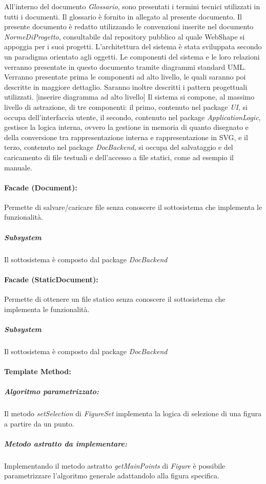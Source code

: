 All'interno del documento \textit{Glossario}, sono presentati i termini tecnici utilizzati in tutti i documenti. Il glossario \`e fornito in allegato al presente documento.
Il presente documento \`e redatto utilizzando le convenzioni inserite nel documento \textit{NormeDiProgetto}, consultabile dal repository pubblico al quale WebShape si appoggia per i suoi progetti.
L'architettura del sistema \`e stata sviluppata secondo un paradigma orientato agli oggetti. Le componenti del sistema e le loro relazioni verranno presentate in questo documento tramite diagrammi standard UML. Verranno presentate prima le componenti ad alto livello, le quali saranno poi descritte in maggiore dettaglio. Saranno inoltre descritti i pattern progettuali utilizzati.
[inserire diagramma ad alto livello]
Il sistema si compone, al massimo livello di astrazione, di tre componenti: il primo, contenuto nel package \textit{UI}, si occupa dell'interfaccia utente, il secondo, contenuto nel package \textit{ApplicationLogic}, gestisce la logica interna, ovvero la gestione in memoria di quanto disegnato e della conversione tra rappresentazione interna e rappresentazione in SVG, e il terzo, contenuto nel package \textit{DocBackend}, si occupa del salvataggio e del caricamento di file testuali e dell'accesso a file statici, come ad esempio il manuale.
\paragraph{Facade (Document):}
Permette di salvare/caricare file senza conoscere il sottosistema che implementa le funzionalit\`a.
\subparagraph{Subsystem} Il sottosistema \`e composto dal package \textit{DocBackend}

\paragraph{Facade (StaticDocument):}
Permette di ottenere un file statico senza conoscere il sottosistema che implementa le funzionalit\`a.
\subparagraph{Subsystem} Il sottosistema \`e composto dal package \textit{DocBackend}

\paragraph{Template Method:}
\subparagraph{Algoritmo parametrizzato:}
Il metodo \textit{setSelection} di \textit{FigureSet} implementa la logica di selezione di una figura a partire da un punto.
\subparagraph{Metodo astratto da implementare:}
Implementando il metodo astratto \textit{getMainPoints} di \textit{Figure} \`e possibile parametrizzare l'algoritmo generale adattandolo alla figura specifica.

